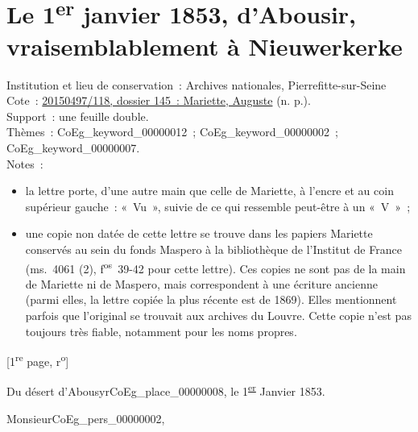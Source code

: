 \documentclass{book}
\begin{document}
\section*{Le 1\textsuperscript{er} janvier 1853, d’Abousir, vraisemblablement à Nieuwerkerke}  
{\footnotesize
\noindent Institution et lieu de conservation~: Archives nationales, Pierrefitte-sur-Seine\\
Cote~: \hyperlink{CoEg_Mariette_ms_001}{20150497/118, dossier 145~: Mariette, Auguste} (n. p.).\\
Support~: une feuille double.\\
Thèmes~: \gls{CoEg_keyword_00000012}~; \gls{CoEg_keyword_00000002}~; \gls{CoEg_keyword_00000007}.\\
Notes~: \begin{itemize} \item la lettre porte, d’une autre main que celle de Mariette, à l’encre et au coin supérieur gauche~: «~Vu~», suivie de ce qui ressemble peut-être à un «~V~»~;
\item une copie non datée de cette lettre se trouve dans les papiers Mariette conservés au sein du fonds Maspero à la bibliothèque de l’Institut de France (ms.~4061 (2), f\textsuperscript{os}~39-42 pour cette lettre). Ces copies ne sont pas de la main de Mariette ni de Maspero, mais correspondent à une écriture ancienne (parmi elles, la lettre copiée la plus récente est de 1869). Elles mentionnent parfois que l’original se trouvait aux archives du Louvre. Cette copie n’est pas toujours très fiable, notamment pour les noms propres. \end{itemize}
\begin{center} {[1\textsuperscript{re} page, r\textsuperscript{o}]}\end{center}}
\begin{flushright}Du désert d’Abousyr\gls{CoEg_place_00000008}, le 1\textsuperscript{\underline{er}}  Janvier 1853.\end{flushright}
\hspace{1cm} Monsieur\gls{CoEg_pers_00000002},\\
\end{document}
